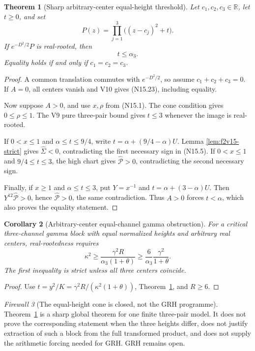 \documentclass[11pt]{article}
\newtheorem{theorem}{Theorem}[section]
\newtheorem{corollary}[theorem]{Corollary}
\theoremstyle{definition}
\theoremstyle{remark}
\newtheorem{firewall}[theorem]{Firewall}
\begin{document}
\begin{theorem}[Sharp arbitrary-center equal-height threshold]
\label{thm:f2v15-arbitrary-centers}
Let \(c_1,c_2,c_3\in\mathbb R\), let \(t\geq0\), and set
\[
 P(z)=\prod_{j=1}^3\bigl((z-c_j)^2+t\bigr).
 \tag{N15.22}
\]
If \(e^{-D^2/2}P\) is real-rooted, then
\[
 t\leq\alpha_3.
 \tag{N15.23}
\]
Equality holds if and only if \(c_1=c_2=c_3\).
\end{theorem}

\begin{proof}
A common translation commutes with \(e^{-D^2/2}\), so assume
\(c_1+c_2+c_3=0\).  If \(A=0\), all centers vanish and V10 gives
\textup{(N15.23)}, including equality.

Now suppose \(A>0\), and use \(x,\rho\) from \textup{(N15.1)}.  The cone
condition gives \(0\leq\rho\leq1\).  The V9 pure three-pair bound gives
\(t\leq3\) whenever the image is real-rooted.

If \(0<x\leq1\) and \(\alpha\leq t\leq9/4\), write
\(t=\alpha+(9/4-\alpha)U\).  Lemma
\ref{lem:f2v15-strict} gives
\(\widehat\Sigma<0\), contradicting the first necessary sign in
\textup{(N15.5)}.  If \(0<x\leq1\) and \(9/4\leq t\leq3\), the high chart
gives \(\widehat{\mathcal P}>0\), contradicting the second necessary sign.

Finally, if \(x\geq1\) and \(\alpha\leq t\leq3\), put \(Y=x^{-1}\) and
\(t=\alpha+(3-\alpha)U\).  Then
\(Y^{12}\widehat{\mathcal P}>0\), hence
\(\widehat{\mathcal P}>0\), the same contradiction.  Thus \(A>0\) forces
\(t<\alpha\), which also proves the equality statement.
\end{proof}

\begin{corollary}[Arbitrary-center equal-channel gamma obstruction]
\label{cor:f2v15-gamma}
For a critical three-channel gamma block with equal normalized heights and
arbitrary real centers, real-rootedness requires
\[
 \kappa^2\geq
 \frac{\gamma^2R}{\alpha_3(1+\theta)}
 \geq\frac6{\alpha_3}\frac{\gamma^2}{1+\theta}.
 \tag{N15.24}
\]
The first inequality is strict unless all three centers coincide.
\end{corollary}

\begin{proof}
Use
\(t=y^2/K=\gamma^2R/(\kappa^2(1+\theta))\),
Theorem~\ref{thm:f2v15-arbitrary-centers}, and \(R\geq6\).
\end{proof}

\begin{firewall}[The equal-height cone is closed, not the GRH programme]
Theorem~\ref{thm:f2v15-arbitrary-centers} is a sharp global theorem for
one finite three-pair model.  It does not prove the corresponding statement
when the three heights differ, does not justify extraction of such a block
from the full transformed product, and does not supply the arithmetic
forcing needed for GRH.  GRH remains open.
\end{firewall}
\end{document}

